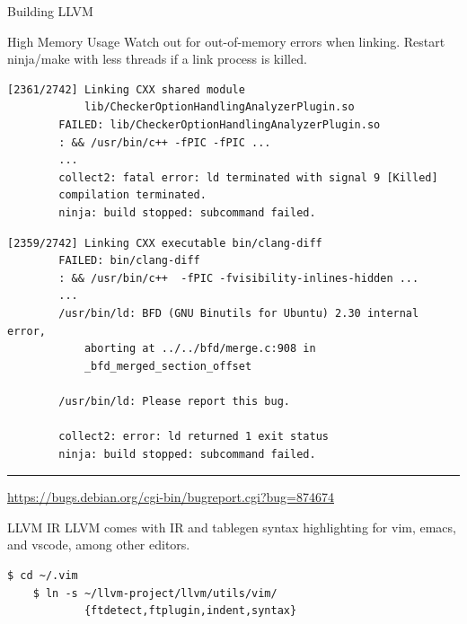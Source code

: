 \documentclass{beamer}
\begin{document}
\begin{frame}[fragile]{Building LLVM}
    \begin{alertblock}{High Memory Usage}
        Watch out for out-of-memory errors when linking. Restart ninja/make with less threads if a link process is killed.
    \end{alertblock}

    \vspace{-2ex}

    \begin{overprint}
        \begin{lstlisting}[gobble=8]
        [2361/2742] Linking CXX shared module
            lib/CheckerOptionHandlingAnalyzerPlugin.so
        FAILED: lib/CheckerOptionHandlingAnalyzerPlugin.so
        : && /usr/bin/c++ -fPIC -fPIC ...
        ...
        collect2: fatal error: ld terminated with signal 9 [Killed]
        compilation terminated.
        ninja: build stopped: subcommand failed.
        \end{lstlisting}

        \begin{lstlisting}[gobble=8]
        [2359/2742] Linking CXX executable bin/clang-diff
        FAILED: bin/clang-diff
        : && /usr/bin/c++  -fPIC -fvisibility-inlines-hidden ...
        ...
        /usr/bin/ld: BFD (GNU Binutils for Ubuntu) 2.30 internal error,
            aborting at ../../bfd/merge.c:908 in
            _bfd_merged_section_offset

        /usr/bin/ld: Please report this bug.

        collect2: error: ld returned 1 exit status
        ninja: build stopped: subcommand failed.
        \end{lstlisting}

        \vspace{-2ex}
        \rule{3cm}{0.5pt}

        {\footnotesize \url{https://bugs.debian.org/cgi-bin/bugreport.cgi?bug=874674}}
    \end{overprint}
\end{frame}


\begin{frame}[fragile]{LLVM IR}
    LLVM comes with IR and tablegen syntax highlighting for vim, emacs, and vscode, among other editors.

    \vspace{1cm}

    \begin{lstlisting}[gobble=4]
    $ cd ~/.vim
    $ ln -s ~/llvm-project/llvm/utils/vim/
            {ftdetect,ftplugin,indent,syntax}
    \end{lstlisting}
\end{frame}
\end{document}
